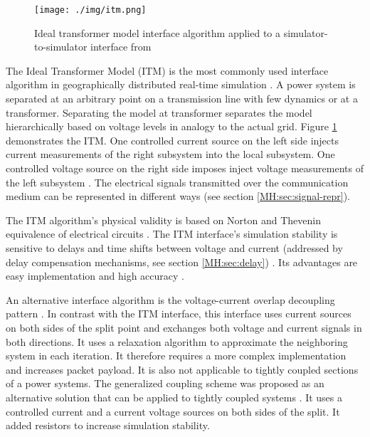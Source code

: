 \documentclass[a4paper,ngerman]{atseminar}
\begin{document}
\begin{figure}[h]
 \centering
    \texttt{[image: ./img/itm.png]}
 \caption{Ideal transformer model interface algorithm applied to a simulator-to-simulator interface from \cite{stevic2015sim}}
 \label{MH:fig:itm}
\end{figure}

\label{MH:sec:itm}
The Ideal Transformer Model (ITM) is the most commonly used interface algorithm in geographically distributed real-time simulation \cite{montoya2020, syed2020standard}. A power system is separated at an arbitrary point on a transmission line with few dynamics or at a transformer. Separating the model at transformer separates the model hierarchically based on voltage levels in analogy to the actual grid. Figure \ref{MH:fig:itm} demonstrates the ITM. One controlled current source on the left side injects current measurements of the right subsystem into the local subsystem. One controlled voltage source on the right side imposes inject voltage measurements of the left subsystem \cite{stevic2017europe}. The electrical signals transmitted over the communication medium can be represented in different ways (see section \ref{MH:sec:signal-repr}).

The ITM algorithm's physical validity is based on Norton and Thevenin equivalence of electrical circuits \cite{ren2008}. The ITM interface's simulation stability is sensitive to delays and time shifts between voltage and current (addressed by delay compensation mechanisms, see section \ref{MH:sec:delay}) \cite{stevic2015sim}. Its advantages are easy implementation and high accuracy \cite{brandl2017}.

An alternative interface algorithm is the voltage-current overlap decoupling pattern \cite{wu2006}. In contrast with the ITM interface, this interface uses current sources on both sides of the split point and exchanges both voltage and current signals in both directions. It uses a relaxation algorithm to approximate the neighboring system in each iteration. It therefore requires a more complex implementation and increases packet payload. It is also not applicable to tightly coupled sections of a power systems. 
The generalized coupling scheme was proposed as an alternative solution that can be applied to tightly coupled systems \cite{bastos2007}. It uses a controlled current and a current voltage sources on both sides of the split. It added resistors to increase simulation stability.
\end{document}
